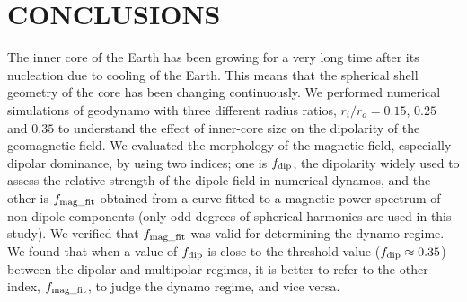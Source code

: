 \section{CONCLUSIONS}

The inner core of the Earth has been growing for a very long time after its nucleation due to cooling of the Earth.
This means that the spherical shell geometry of the core has been changing continuously.
We performed numerical simulations of geodynamo with three different radius ratios, $r_i / r_o = 0.15$, $0.25$ and $0.35$ to understand the effect of inner-core size on the dipolarity of the geomagnetic field.
We evaluated the morphology of the magnetic field, especially dipolar dominance, by using two indices; one is $f_{\rm dip}$, the dipolarity widely used to assess the relative strength of the dipole field in numerical dynamos, and the other is $f_{\rm mag\_fit}$ obtained from a curve fitted to a magnetic power spectrum of non-dipole components (only odd degrees of spherical harmonics are used in this study).
We verified that $f_{\rm mag\_fit}$ was valid for determining the dynamo regime.
We found that when a value of $f_{\rm dip}$ is close to the threshold value ($f_{\rm dip} \approx 0.35$) between the dipolar and multipolar regimes, it is better to refer to the other index, $f_{\rm mag\_fit}$, to judge the dynamo regime, and vice versa.

